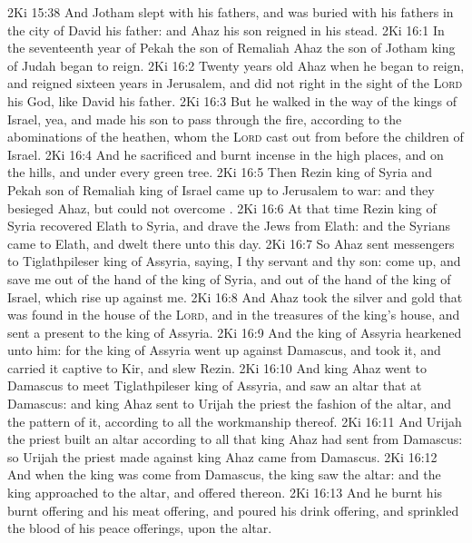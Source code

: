 \vs 2Ki 15:38 And Jotham slept with his fathers, and was buried with his fathers in the city of David his father: and Ahaz his son reigned in his stead.
\vs 2Ki 16:1 In the seventeenth year of Pekah the son of Remaliah Ahaz the son of Jotham king of Judah began to reign.
\vs 2Ki 16:2 Twenty years old  Ahaz when he began to reign, and reigned sixteen years in Jerusalem, and did not  right in the sight of the \textsc{Lord} his God, like David his father.
\vs 2Ki 16:3 But he walked in the way of the kings of Israel, yea, and made his son to pass through the fire, according to the abominations of the heathen, whom the \textsc{Lord} cast out from before the children of Israel.
\vs 2Ki 16:4 And he sacrificed and burnt incense in the high places, and on the hills, and under every green tree.
\vs 2Ki 16:5 Then Rezin king of Syria and Pekah son of Remaliah king of Israel came up to Jerusalem to war: and they besieged Ahaz, but could not overcome .
\vs 2Ki 16:6 At that time Rezin king of Syria recovered Elath to Syria, and drave the Jews from Elath: and the Syrians came to Elath, and dwelt there unto this day.
\vs 2Ki 16:7 So Ahaz sent messengers to Tiglathpileser king of Assyria, saying, I  thy servant and thy son: come up, and save me out of the hand of the king of Syria, and out of the hand of the king of Israel, which rise up against me.
\vs 2Ki 16:8 And Ahaz took the silver and gold that was found in the house of the \textsc{Lord}, and in the treasures of the king's house, and sent  a present to the king of Assyria.
\vs 2Ki 16:9 And the king of Assyria hearkened unto him: for the king of Assyria went up against Damascus, and took it, and carried  it captive to Kir, and slew Rezin.
\vs 2Ki 16:10 And king Ahaz went to Damascus to meet Tiglathpileser king of Assyria, and saw an altar that  at Damascus: and king Ahaz sent to Urijah the priest the fashion of the altar, and the pattern of it, according to all the workmanship thereof.
\vs 2Ki 16:11 And Urijah the priest built an altar according to all that king Ahaz had sent from Damascus: so Urijah the priest made  against king Ahaz came from Damascus.
\vs 2Ki 16:12 And when the king was come from Damascus, the king saw the altar: and the king approached to the altar, and offered thereon.
\vs 2Ki 16:13 And he burnt his burnt offering and his meat offering, and poured his drink offering, and sprinkled the blood of his peace offerings, upon the altar.
